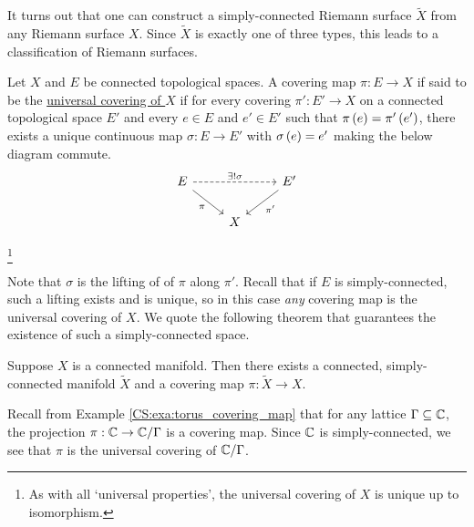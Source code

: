 \documentclass[../Moduli_Spaces_of_Riemann_Surfaces.tex]{subfiles}
\begin{document}
    \begin{remark}
        It turns out that one can construct a simply-connected Riemann surface $\tilde{X}$ from any Riemann surface $X$. Since $\tilde{X}$ is exactly one of three types, this leads to a classification of Riemann surfaces.\exqed
    \end{remark}
    \begin{definition}
        Let $X$ and $E$ be connected topological spaces. A covering map $\pi:E\to X$ if said to be the \ul{universal covering of $X$} if for every covering $\pi':E'\to X$ on a connected topological space $E'$ and every $e\in E$ and $e'\in E'$ such that $\pi\left(e\right)=\pi'\left(e'\right)$, there exists a unique continuous map $\sigma:E\to E'$ with $\sigma\left(e\right)=e'$ making the below diagram commute.
        \begin{equation*}
            \begin{tikzcd}
                E \ar[rr, "\ex!\sigma", dashed] \ar[dr, "\pi"'] & & E' \ar[dl, "\pi'"] \\
                                                    & X
            \end{tikzcd}
        \end{equation*}
    \end{definition}
    \footnote{As with all `universal properties', the universal covering of $X$ is unique up to isomorphism.}
    \vspace{-0.05in}
    \begin{remark}
        Note that $\sigma$ is the lifting of of $\pi$ along $\pi'$. Recall that if $E$ is simply-connected, such a lifting exists and is unique, so in this case \textit{any} covering map is the universal covering of $X$. We quote the following theorem that guarantees the existence of such a simply-connected space.\exqed
    \end{remark}
    \begin{theorem}
        Suppose $X$ is a connected manifold. Then there exists a connected, simply-connected manifold $\tilde{X}$ and a covering map $\pi:\tilde{X}\to X$.
    \end{theorem}
    \begin{example}
        Recall from Example \ref{CS:exa:torus_covering_map} that for any lattice $\Gamma\subseteq\mathbb{C}$, the projection $\pi:\mathbb{C}\to\mathbb{C}/\Gamma$ is a covering map. Since $\mathbb{C}$ is simply-connected, we see that $\pi$ is the universal covering of $\mathbb{C}/\Gamma$.\exqed
    \end{example}
\end{document}

